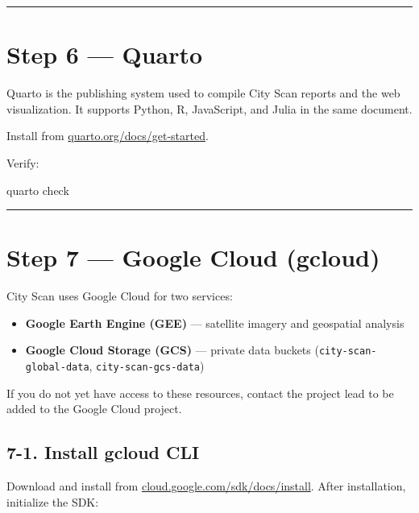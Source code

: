 \documentclass[
  letterpaper,
  DIV=11,
  numbers=noendperiod]{scrreprt}
\newenvironment{Shaded}{\begin{snugshade}}{\end{snugshade}}
\newcommand{\ExtensionTok}[1]{\textcolor[rgb]{0.00,0.23,0.31}{#1}}
\newcommand{\NormalTok}[1]{\textcolor[rgb]{0.00,0.23,0.31}{#1}}
\providecommand{\tightlist}{%
  \setlength{\itemsep}{0pt}\setlength{\parskip}{0pt}}
\begin{document}
\begin{center}\rule{0.5\linewidth}{0.5pt}\end{center}

\section{Step 6 --- Quarto}\label{step-6-quarto}

Quarto is the publishing system used to compile City Scan reports and
the web visualization. It supports Python, R, JavaScript, and Julia in
the same document.

Install from
\href{https://quarto.org/docs/get-started/}{quarto.org/docs/get-started}.

Verify:

\begin{Shaded}
\begin{Highlighting}[]
\ExtensionTok{quarto}\NormalTok{ check}
\end{Highlighting}
\end{Shaded}

\begin{center}\rule{0.5\linewidth}{0.5pt}\end{center}

\section{Step 7 --- Google Cloud
(gcloud)}\label{step-7-google-cloud-gcloud}

City Scan uses Google Cloud for two services:

\begin{itemize}
\tightlist
\item
  \textbf{Google Earth Engine (GEE)} --- satellite imagery and
  geospatial analysis
\item
  \textbf{Google Cloud Storage (GCS)} --- private data buckets
  (\texttt{city-scan-global-data}, \texttt{city-scan-gcs-data})
\end{itemize}

If you do not yet have access to these resources, contact the project
lead to be added to the Google Cloud project.

\subsection{7-1. Install gcloud CLI}\label{install-gcloud-cli}

Download and install from
\href{https://cloud.google.com/sdk/docs/install}{cloud.google.com/sdk/docs/install}.
After installation, initialize the SDK:
\end{document}

